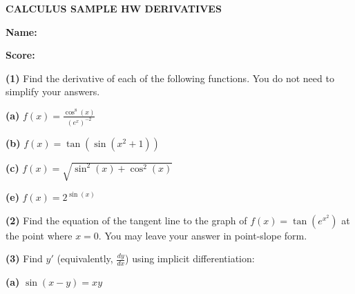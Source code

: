 \documentclass[letterpaper,11pt]{article}
\def\ds{\displaystyle}
\begin{document}

\begin{center} {\large \textbf{CALCULUS SAMPLE HW DERIVATIVES}}



\end{center}

{ \textbf{Name:} \underline{\hspace{8cm}} 

\medskip

\textbf{Score:} \underline{\hspace{8cm}}}

\bigskip


\bigskip
\bigskip

\noindent \textbf{(1)} Find the derivative of each of the following functions.  You do not need to simplify your answers.   

\vspace{.5cm}

\noindent \textbf{(a)} $f(x) = \ds \frac{\cos ^8 (x)}{(e^x)^{-2}}$

\vspace{3cm}

\noindent \textbf{(b)} $f(x) = \tan (\sin ( x^2+1))$

\vspace{3cm}

\noindent \textbf{(c)} $f(x) = \sqrt{\sin ^2(x) + \cos ^2(x)}$



\vspace{3cm}

\noindent \textbf{(e)} $f(x) = 2^{\sin (x)}$








\newpage







\noindent \textbf{(2)} Find the equation of the tangent line to the graph of $f(x) = \ds \tan (e^{x^2})$ at the point where $x=0$.  You may leave your answer in point-slope form.   

  

\vspace{5cm}

\noindent \textbf{(3)} Find $y'$ (equivalently, $\ds \frac{dy}{dx}$) using implicit differentiation: 

\noindent \textbf{(a)} $\sin(x - y) = xy$ 
\end{document}

